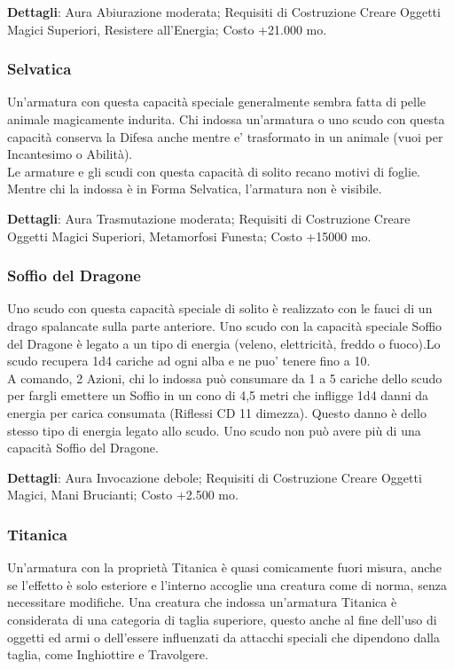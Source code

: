 \begin{multicols}{2}
\textbf{Dettagli}: Aura Abiurazione moderata; Requisiti di Costruzione Creare Oggetti Magici Superiori, Resistere all'Energia; Costo +21.000 mo.

\subsubsection{Selvatica}

Un'armatura con questa capacità speciale generalmente sembra fatta di pelle animale magicamente indurita. Chi indossa un'armatura o uno scudo con questa capacità conserva la Difesa anche mentre e' trasformato in un animale (vuoi per Incantesimo o Abilità).\\
Le armature e gli scudi con questa capacità di solito recano motivi di foglie. Mentre chi la indossa è in Forma Selvatica, l'armatura non è visibile.

\textbf{Dettagli}: Aura Trasmutazione moderata; Requisiti di Costruzione Creare Oggetti Magici Superiori, Metamorfosi Funesta; Costo +15000 mo.

\subsubsection{Soffio del Dragone}

Uno scudo con questa capacità speciale di solito è realizzato con le fauci di un drago spalancate sulla parte anteriore. Uno scudo con la capacità speciale Soffio del Dragone è legato a un tipo di energia (veleno, elettricità, freddo o fuoco).Lo scudo recupera 1d4 cariche ad ogni alba e ne puo' tenere fino a 10. \\
A comando, 2 Azioni, chi lo indossa può consumare da 1 a 5 cariche dello scudo per fargli emettere un Soffio in un cono di 4,5 metri che infligge 1d4 danni da energia per carica consumata (Riflessi CD 11 dimezza). Questo danno è dello stesso tipo di energia legato allo scudo. Uno scudo non può avere più di una capacità Soffio del Dragone.

\textbf{Dettagli}: Aura Invocazione debole; Requisiti di Costruzione Creare Oggetti Magici, Mani Brucianti; Costo +2.500 mo.

\subsubsection{Titanica}

Un'armatura con la proprietà Titanica è quasi comicamente fuori misura, anche se l'effetto è solo esteriore e l'interno accoglie una creatura come di norma, senza necessitare modifiche. Una creatura che indossa un'armatura Titanica è considerata di una categoria di taglia superiore, questo anche al fine dell'uso di oggetti ed armi o dell'essere influenzati da attacchi speciali che dipendono dalla taglia, come Inghiottire e Travolgere.\\


\end{multicols}
